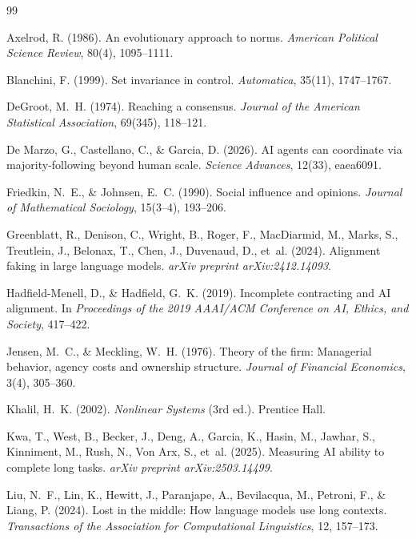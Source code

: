 \documentclass{article}
\begin{document}
\begin{thebibliography}{99}

Axelrod, R. (1986). An evolutionary approach to norms. \emph{American Political Science Review}, 80(4), 1095--1111.

Blanchini, F. (1999). Set invariance in control. \emph{Automatica}, 35(11), 1747--1767.

DeGroot, M.~H. (1974). Reaching a consensus. \emph{Journal of the American Statistical Association}, 69(345), 118--121.

De Marzo, G., Castellano, C., \& Garcia, D. (2026). AI agents can coordinate via majority-following beyond human scale. \emph{Science Advances}, 12(33), eaea6091.

Friedkin, N.~E., \& Johnsen, E.~C. (1990). Social influence and opinions. \emph{Journal of Mathematical Sociology}, 15(3--4), 193--206.

Greenblatt, R., Denison, C., Wright, B., Roger, F., MacDiarmid, M., Marks, S., Treutlein, J., Belonax, T., Chen, J., Duvenaud, D., et~al. (2024). Alignment faking in large language models. \emph{arXiv preprint arXiv:2412.14093}.

Hadfield-Menell, D., \& Hadfield, G.~K. (2019). Incomplete contracting and AI alignment. In \emph{Proceedings of the 2019 AAAI/ACM Conference on AI, Ethics, and Society}, 417--422.

Jensen, M.~C., \& Meckling, W.~H. (1976). Theory of the firm: Managerial behavior, agency costs and ownership structure. \emph{Journal of Financial Economics}, 3(4), 305--360.

Khalil, H.~K. (2002). \emph{Nonlinear Systems} (3rd ed.). Prentice Hall.

Kwa, T., West, B., Becker, J., Deng, A., Garcia, K., Hasin, M., Jawhar, S., Kinniment, M., Rush, N., Von Arx, S., et~al. (2025). Measuring AI ability to complete long tasks. \emph{arXiv preprint arXiv:2503.14499}.

Liu, N.~F., Lin, K., Hewitt, J., Paranjape, A., Bevilacqua, M., Petroni, F., \& Liang, P. (2024). Lost in the middle: How language models use long contexts. \emph{Transactions of the Association for Computational Linguistics}, 12, 157--173.


\end{thebibliography}
\end{document}
